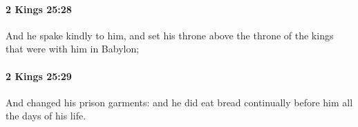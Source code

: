 		\paragraph{2 Kings 25:28} %
			\label{2KINGS-25-28}

			And he spake kindly to him, and set his throne above the throne of the kings that were with him in Babylon;


		\paragraph{2 Kings 25:29} %
			\label{2KINGS-25-29}

			And changed his prison garments: and he did eat bread continually before him all the days of his life.


